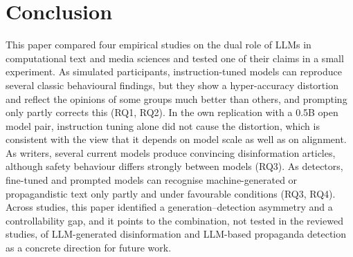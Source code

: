 \section{Conclusion}
\label{sec:conclusion}

This paper compared four empirical studies on the dual role of LLMs in computational text and media sciences and tested one of their claims in a small experiment. As simulated participants, instruction-tuned models can reproduce several classic behavioural findings, but they show a hyper-accuracy distortion and reflect the opinions of some groups much better than others, and prompting only partly corrects this (RQ1, RQ2). In the own replication with a 0.5B open model pair, instruction tuning alone did not cause the distortion, which is consistent with the view that it depends on model scale as well as on alignment. As writers, several current models produce convincing disinformation articles, although safety behaviour differs strongly between models (RQ3). As detectors, fine-tuned and prompted models can recognise machine-generated or propagandistic text only partly and under favourable conditions (RQ3, RQ4). Across studies, this paper identified a generation--detection asymmetry and a controllability gap, and it points to the combination, not tested in the reviewed studies, of LLM-generated disinformation and LLM-based propaganda detection as a concrete direction for future work.
